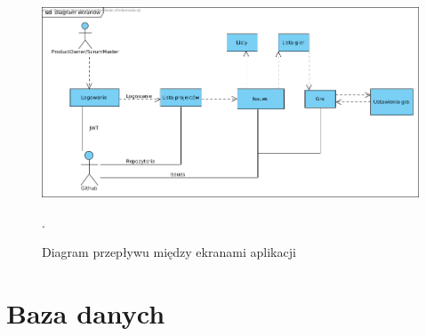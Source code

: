 \begin{figure}[h]
	\centering\includegraphics[width=.7\textwidth]{img/ScreensDiagram}
	\caption{Diagram przepływu między ekranami aplikacji}.
	\label{rys:ScreensDiagram}
\end{figure}

\section{Baza danych}

